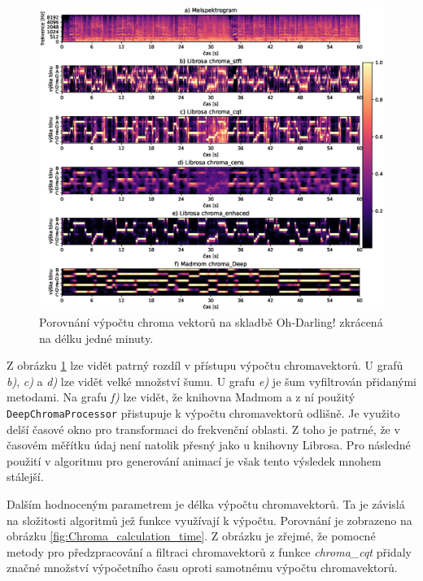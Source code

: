 \begin{figure}[H]
    \centering
    \includegraphics[width = 1\linewidth]{obrazky/Oh-Darling_chroma_analysis_graphs.eps}
    \caption{Porovnání výpočtu chroma vektorů na skladbě Oh-Darling! zkrácená na délku jedné minuty.}
    \label{fig:Chroma_analysis}
\end{figure}

Z obrázku \ref{fig:Chroma_analysis} lze vidět patrný rozdíl v přístupu výpočtu chromavektorů. U grafů \textit{b)}, \textit{c)} a \textit{d)} lze vidět velké množství šumu. U grafu \textit{e)} je šum vyfiltrován přidanými metodami. Na grafu \textit{f)} lze vidět, že knihovna Madmom a z ní použitý \texttt{DeepChromaProcessor} přistupuje k výpočtu chromavektorů odlišně. Je využito delší časové okno pro transformaci do frekvenční oblasti. Z toho je patrné, že v časovém měřítku údaj není natolik přesný jako u knihovny Librosa. Pro následné použití v algoritmu pro generování animací je však tento výsledek mnohem stálejší. 

Dalším hodnoceným parametrem je délka výpočtu chromavektorů. Ta je závislá na složitosti algoritmů jež funkce využívají k výpočtu. Porovnání je zobrazeno na obrázku \ref{fig:Chroma_calculation_time}. Z obrázku je zřejmé, že pomocné metody pro předzpracování a filtraci chromavektorů z funkce \textit{chroma\_cqt} přidaly značné množství výpočetního času oproti samotnému výpočtu chromavektorů.

